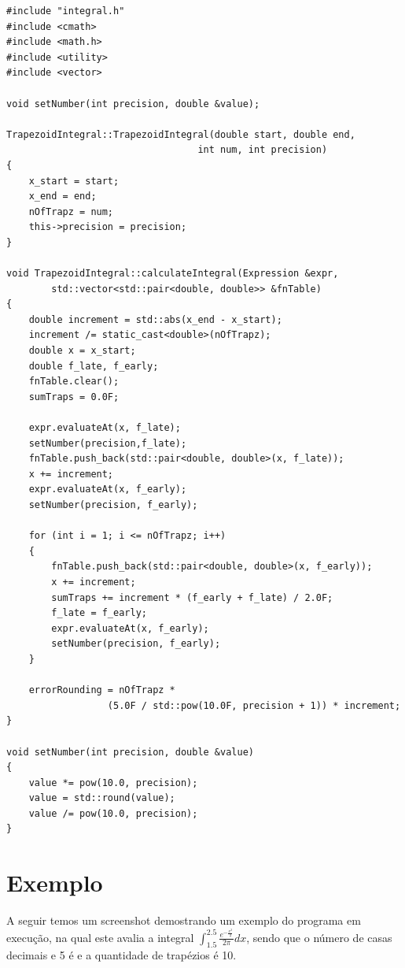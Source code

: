 \documentclass[14pt, letterpaper]{article}
\newcommand\tab[1][1cm]{\hspace*{#1}}
\begin{document}
\begin{spacing}{3.5}
\end{spacing}

\begin{lstlisting}[caption=integral.cpp]
#include "integral.h"
#include <cmath>
#include <math.h>
#include <utility>
#include <vector>

void setNumber(int precision, double &value);

TrapezoidIntegral::TrapezoidIntegral(double start, double end,
                                  int num, int precision)
{
    x_start = start;
    x_end = end;
    nOfTrapz = num;
    this->precision = precision;
}

void TrapezoidIntegral::calculateIntegral(Expression &expr,
        std::vector<std::pair<double, double>> &fnTable)
{
    double increment = std::abs(x_end - x_start);
    increment /= static_cast<double>(nOfTrapz);
    double x = x_start;
    double f_late, f_early;
    fnTable.clear();
    sumTraps = 0.0F;

    expr.evaluateAt(x, f_late);
    setNumber(precision,f_late);
    fnTable.push_back(std::pair<double, double>(x, f_late));
    x += increment;
    expr.evaluateAt(x, f_early);
    setNumber(precision, f_early);

    for (int i = 1; i <= nOfTrapz; i++)
    {
        fnTable.push_back(std::pair<double, double>(x, f_early));
        x += increment;
        sumTraps += increment * (f_early + f_late) / 2.0F;
        f_late = f_early;
        expr.evaluateAt(x, f_early);
        setNumber(precision, f_early);
    }    

    errorRounding = nOfTrapz * 
                  (5.0F / std::pow(10.0F, precision + 1)) * increment;
}

void setNumber(int precision, double &value)
{
    value *= pow(10.0, precision);
    value = std::round(value);
    value /= pow(10.0, precision);
}
\end{lstlisting}

\section{Exemplo}
\tab A seguir temos um screenshot demostrando um exemplo do programa em execução, na qual este avalia a 
integral $\int_{1.5}^{2.5}\frac{e^{-\frac{x^2}{2}}}{2\pi}dx$, sendo que o número de casas decimais e 5 é
e a quantidade de trapézios é 10.\\[5.0mm]
\end{document}

